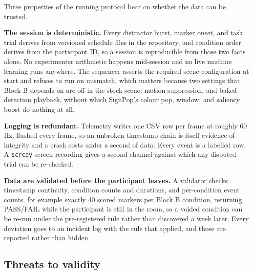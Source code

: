 Three properties of the running protocol bear on whether the data can be trusted.

\textbf{The session is deterministic.} Every distractor burst, marker onset, and task trial derives
from versioned schedule files in the repository, and condition order derives from the participant ID,
so a session is reproducible from those two facts alone. No experimenter arithmetic happens
mid-session and no live machine learning runs anywhere. The sequencer asserts the required scene
configuration at start and refuses to run on mismatch, which matters because two settings that Block
B depends on are off in the stock scene: motion suppression, and baked-detection playback, without
which SignPop's colour pop, window, and saliency boost do nothing at all.

\textbf{Logging is redundant.} Telemetry writes one CSV row per frame at roughly 60 Hz, flushed every
frame, so an unbroken timestamp chain is itself evidence of integrity and a crash costs under a
second of data. Every event is a labelled row. A \verb|scrcpy| screen recording gives a second channel
against which any disputed trial can be re-checked.

\textbf{Data are validated before the participant leaves.} A validator checks timestamp continuity,
condition counts and durations, and per-condition event counts, for example exactly 40 scored markers
per Block B condition, returning PASS/FAIL while the participant is still in the room, so a voided
condition can be re-run under the pre-registered rule rather than discovered a week later. Every
deviation goes to an incident log with the rule that applied, and those are reported rather than
hidden.

\subsection{Threats to validity}

